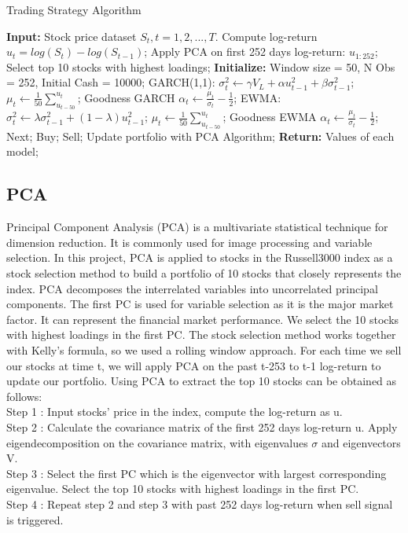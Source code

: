 \documentclass[11pts]{article}
\begin{document}
\begin{algorithm}[H]
\caption{Trading Strategy Algorithm}
\begin{algorithmic}[1]
\State \textbf{Input:} Stock price dataset $S_{t}, t = 1, 2, ..., T$.
\State Compute log-return $u_{t} = log(S_{t})-log(S_{t-1})$;
\State Apply PCA on first 252 days log-return: $u_{1:252}$;
\State Select top 10 stocks with highest loadings;
\State \textbf{Initialize:} Window size = 50, N Obs = 252, Initial Cash = 10000;
\State GARCH(1,1):
\State $\sigma_{t}^{2} \gets \gamma V_{L}+\alpha u_{t-1}^{2} + \beta \sigma_{t-1}^{2}$;
\State $\mu_{t} \gets \frac{1}{50}\sum_{u_{t-50}}^{u_{t}}$;
\State Goodness GARCH $\alpha_{t} \gets \frac{\mu_{t}}{\sigma_{t}} - \frac{1}{2}$;
\State EWMA:
\State $\sigma_{t}^{2} \gets \lambda \sigma_{t-1}^{2}+(1-\lambda)u_{t-1}^{2}$;
\State $\mu_{t} \gets \frac{1}{50}\sum_{u_{t-50}}^{u_{t}}$;
\State Goodness EWMA $\alpha_{t} \gets \frac{\mu_{t}}{\sigma_{t}} - \frac{1}{2}$;
\State Next;
\EndIf
{}
\State Buy;
\State Sell;
\State Update portfolio with PCA Algorithm;
\EndIf
\EndFor
\State \textbf{Return:} Values of each model;
\end{algorithmic}
\end{algorithm}

\subsection{PCA}
\label{sec:org1a19e45}
Principal Component Analysis (PCA) is a multivariate statistical technique for dimension reduction. It is commonly used for image processing and variable selection. 
In this project, PCA is applied to stocks in the Russell3000 index as a stock selection method to build a portfolio of 10 stocks that closely represents the index. PCA decomposes the interrelated variables into uncorrelated principal components. The first PC is used for variable selection as it is the major market factor. It can represent the financial market performance. We select the 10 stocks with highest loadings in the first PC. The stock selection method works together with Kelly's formula, so we used a rolling window approach. For each time we sell our stocks at time t, we will apply PCA on the past t-253 to t-1 log-return to update our portfolio.
Using PCA to extract the top 10 stocks can be obtained as follows: \\
Step 1 : Input stocks' price in the index, compute the log-return as u. \\
Step 2 : Calculate the covariance matrix of the first 252 days log-return u. Apply eigendecomposition on the covariance matrix, with eigenvalues \(\sigma\) and eigenvectors V. \\
Step 3 : Select the first PC which is the eigenvector with largest corresponding eigenvalue. Select the top 10 stocks with highest loadings in the first PC. \\
Step 4 : Repeat step 2 and step 3 with past 252 days log-return when sell signal is triggered. \\
\end{document}
